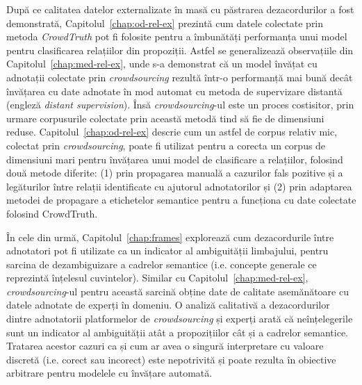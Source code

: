 După ce calitatea datelor externalizate în masă cu păstrarea dezacordurilor a fost demonstrată, Capitolul~\ref{chap:od-rel-ex} prezintă cum datele colectate prin metoda \textit{CrowdTruth} pot fi folosite pentru a îmbunătăți performanța unui model pentru clasificarea relațiilor din propoziții. Astfel se generalizează observațiile din Capitolul~\ref{chap:med-rel-ex}, unde s-a demonstrat că un model învățat cu adnotații colectate prin \textit{crowdsourcing} rezultă într-o performanță mai bună decât învățarea cu date adnotate în mod automat cu metoda de supervizare distantă (engleză \textit{distant supervision}). Însă \textit{crowdsourcing}-ul este un proces costisitor, prin urmare corpusurile colectate prin această metodă tind să fie de dimensiuni reduse. Capitolul~\ref{chap:od-rel-ex} descrie cum un astfel de corpus relativ mic, colectat prin \textit{crowdsourcing}, poate fi utilizat pentru a corecta un corpus de dimensiuni mari pentru învățarea unui model de clasificare a relațiilor, folosind două metode diferite: (1) prin propagarea manuală a cazurilor fals pozitive și a legăturilor între relații identificate cu ajutorul adnotatorilor și (2) prin adaptarea metodei de propagare a etichetelor semantice pentru a funcționa cu date colectate folosind CrowdTruth.

În cele din urmă, Capitolul~\ref{chap:frames} explorează cum dezacordurile între adnotatori pot fi utilizate ca un indicator al ambiguității limbajului, pentru sarcina de dezambiguizare a cadrelor semantice (i.e. concepte generale ce reprezintă înțelesul cuvintelor). Similar cu Capitolul~\ref{chap:med-rel-ex}, \textit{crowdsourcing}-ul pentru această sarcină obține date de calitate asemănătoare cu datele adnotate de experți în domeniu. O analiză calitativă a dezacordurilor dintre adnotatorii platformelor de \textit{crowdsourcing} și experți arată că neînțelegerile sunt un indicator al ambiguității atât a propozițiilor cât și a cadrelor semantice. Tratarea acestor cazuri ca și cum ar avea o singură interpretare cu valoare discretă (i.e. corect sau incorect) este nepotrivită și poate rezulta în obiective arbitrare pentru modelele cu învățare automată. 






